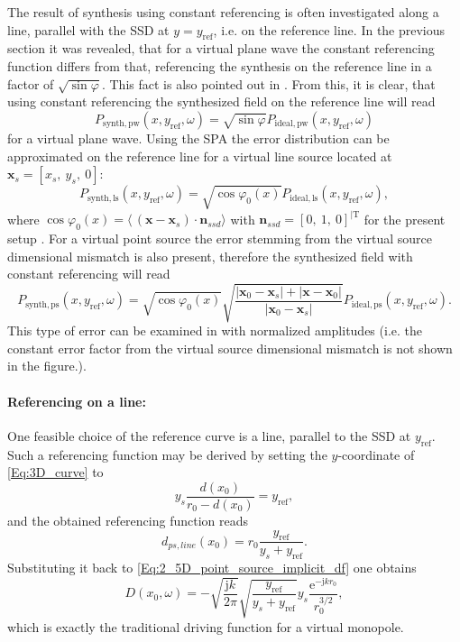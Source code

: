 \documentclass[12pt,a4paper]{article}
\newcommand{\te}{\mathrm{e}}
\newcommand{\ti}{\mathrm{j}}
\newcommand{\sinfi}{\sin\varphi}
\newcommand{\cosfi}{\cos\varphi}
\newcommand{\yref}{y_{\mathrm{ref}}}
\newcommand{\vx}{\mathbf{x}}
\newcommand{\vxo}{\mathbf{x}_0}
\begin{document}
\vspace{3mm}
The result of synthesis using constant referencing is often investigated along a line, parallel with the SSD at $y=\yref$, i.e. on the reference line. In the previous section it was revealed, that for a virtual plane wave  the constant referencing function differs from that, referencing the synthesis on the reference line in a factor of $\sqrt{\sinfi}$. This fact is also pointed out in \cite[3.9.4]{Ahrens2012}. From this, it is clear, that using constant referencing the synthesized field on the reference line will read
\begin{equation}
P_{\mathrm{synth,pw}}(x,\yref,\omega) = \sqrt{\sinfi} P_{\mathrm{ideal,pw}}(x,\yref,\omega) 
\end{equation}
for a virtual plane wave. Using the SPA the error distribution can be approximated on the reference line for a virtual line source located at $\mathbf{x}_s = [x_s,\ y_s,\ 0]$:
\begin{equation}
P_{\mathrm{synth,ls}}(x,\yref,\omega) = \sqrt{\cosfi_0(x)} P_{\mathrm{ideal,ls}}(x,\yref,\omega),
\end{equation}
where $\cosfi_0(x) = \langle\, ( \vx- \mathbf{x}_s ) \cdot \mathbf{n}_{ssd}\rangle$ with $\mathbf{n}_{ssd} = [0,\ 1,\ 0]^{|\mathrm{T}}$ for the present setup	.
For a virtual point source the error stemming from the virtual source dimensional mismatch is also present, therefore the synthesized field with constant referencing will read
\begin{equation}
P_{\mathrm{synth,ps}}(x,\yref,\omega) = \sqrt{\cosfi_0(x)} 
\sqrt{\frac{ | \vxo - \mathbf{x}_s | + | \vx - \vxo| }{ | \vxo - \mathbf{x}_s |}} 
P_{\mathrm{ideal,ps}}(x,\yref,\omega).
\end{equation}
This type of error can be examined in \cite[Fig.5.13.]{Ahrens2012} with normalized amplitudes (i.e. the constant error factor from the virtual source dimensional mismatch is not shown in the figure.).

\paragraph{Referencing on a line:\\}
One feasible choice of the reference curve is a line, parallel to the SSD at $\yref$. Such a referencing function may be derived by setting the $y$-coordinate of \eqref{Eq:3D_curve} to
\begin{equation}
y_s \frac{d(x_0)}{r_0 - d(x_0)} = \yref,
\end{equation}
and the obtained referencing function reads
\begin{equation}
d_{ps,line}(x_0) = r_0 \frac{\yref}{y_s + \yref}.
\end{equation}
Substituting it back to \eqref{Eq:2_5D_point_source_implicit_df} one obtains
\begin{equation}
D(x_0,\omega) = 
- \sqrt{\frac{\ti k}{2\pi}} \sqrt{\frac{\yref}{y_s + \yref}}  y_s \frac{\te^{-\ti k r_0 }}{r_0^{3/2}},
\end{equation}
which is exactly the traditional driving function for a virtual monopole.
\end{document}
